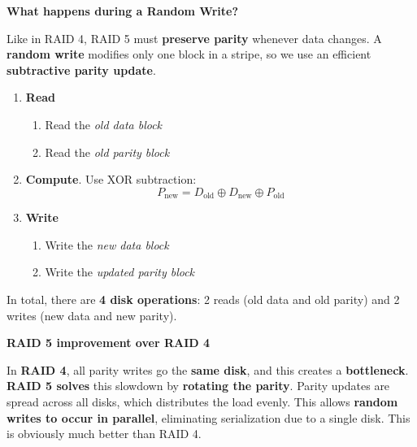 \highspace
\begin{flushleft}
    \textcolor{Green3}{ \textbf{What happens during a Random Write?}}
\end{flushleft}
Like in RAID 4, RAID 5 must \textbf{preserve parity} whenever data changes. A \textbf{random write} modifies only one block in a stripe, so we use an efficient \textbf{subtractive parity update}.
\begin{enumerate}
    \item \textbf{Read}
    \begin{enumerate}
        \item Read the \emph{old data block}
        \item Read the \emph{old parity block}
    \end{enumerate}
    \item \textbf{Compute}. Use XOR subtraction:
    \begin{equation*}
        P_{\text{new}} = D_{\text{old}} \oplus D_{\text{new}} \oplus P_{\text{old}}
    \end{equation*}
    
    \newpage
    
    \item \textbf{Write}
    \begin{enumerate}
        \item Write the \emph{new data block}
        \item Write the \emph{updated parity block}
    \end{enumerate}
\end{enumerate}
In total, there are \textbf{4 disk operations}: 2 reads (old data and old parity) and 2 writes (new data and new parity).

\highspace
\begin{flushleft}
    \textcolor{Green3}{\faIcon{\speedIcon} \textbf{RAID 5 improvement over RAID 4}}
\end{flushleft}
In \textbf{RAID 4}, all parity writes go the \textbf{same disk}, and this creates a \textcolor{Red2}{\textbf{bottleneck}}. \textbf{RAID 5 solves} this slowdown by \textcolor{Green3}{\textbf{rotating the parity}}. Parity updates are spread across all disks, which distributes the load evenly. This allows \textbf{random writes to occur in parallel}, eliminating serialization due to a single disk. This is obviously much better than RAID 4.

